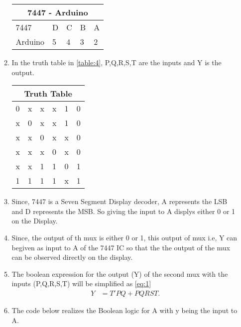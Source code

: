\documentclass{article}
\begin{document}
\begin{enumerate}
\begin{enumerate}
\begin{tabular}{|p{3cm}|p{1cm}|p{1cm}|p{1cm}|p{1cm}|}
					\hline
					\multicolumn{5}{|c|}{7447 - Arduino}\\
					\hline
					7447& D& C& B& A\\
					\hline
					Arduino& 5& 4& 3& 2\\
					\hline
				\end{tabular}
				\newline
			\item In the truth table in \ref{table:4}, P,Q,R,S,T are the inputs and Y is the output.
				\newline{}\label{table:4}\begin{tabular}{|p{1cm}|p{1cm}|p{1cm}|p{1cm}|p{1cm}|p{1cm}|}
					\hline
					\multicolumn{6}{|c|}{Truth Table}\\
					\hline
					0& x& x& x& 1& 0\\
					\hline
					x& 0& x& x& 1& 0\\
					\hline
					x& x& 0& x& x& 0\\
					\hline
					x& x& x& 0& x& 0\\
					\hline
					x& x& 1& 1& 0& 1\\
					\hline
					1& 1& 1& 1& x& 1\\
					\hline
				\end{tabular}
		\newline\item Since, 7447 is a Seven Segment Display decoder, A represents the LSB and D represents the MSB. So giving the input to A displys either 0 or 1 on the Display.
			\item Since, the output of th mux is either 0 or 1, this output of mux i.e, Y can begiven as input to A of the 7447 IC so that the the output of the mux can be observed directly on the display.
			\item The boolean expression for the output (Y) of the second mux with the inputs (P,Q,R,S,T) will be simplified as \ref{eq:1}
				\begin{align}
					{Y} &= {T'PQ} + {PQRST}.
					\label{eq:1}
				\end{align}
				\item The code below realizes the Boolean logic for A with y being the input to A.
					\newline {}
\end{enumerate}
\end{enumerate}
\end{document}
